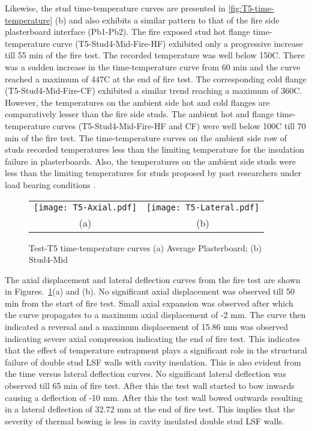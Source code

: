 Likewise, the stud time-temperature curves are presented in \cref{fig:T5-time-temperature} (b) and also exhibits a similar pattern to that of the fire side plasterboard interface (Pb1-Pb2). The fire exposed stud hot flange time-temperature curve (T5-Stud4-Mid-Fire-HF) exhibited only a progressive increase till 55 min of the fire test. The recorded temperature was well below 150\degree C. There was a sudden increase in the time-temperature curve from 60 min and the curve reached a maximum of 447\degree C at the end of fire test. The corresponding cold flange (T5-Stud4-Mid-Fire-CF) exhibited a similar trend reaching a maximum of 360\degree C. However, the temperatures on the ambient side hot and cold flanges are comparatively lesser than the fire side studs. The ambient hot and flange time-temperature curves (T5-Stud4-Mid-Fire-HF and CF) were well below 100\degree C till 70 min of the fire test. The time-temperature curves on the ambient side row of studs recorded temperatures less than the limiting temperature for the insulation failure in plasterboards. Also, the temperatures on the ambient side studs were less than the limiting temperatures for studs proposed by past researchers under load bearing conditions \citet{Feng2003,Gunalan2013a}. 
\begin{figure}[!htbp]
	\centering	
		\begin{tabular}{cc}
			\texttt{[image: T5-Axial.pdf]} & \texttt{[image: T5-Lateral.pdf]} \\
			(a) & (b) \\
			\end{tabular}
		\caption{Test-T5 time-temperature curves (a) Average Plasterboard; (b) Stud4-Mid}
		\label{fig:T5-displacement}
\end{figure}

The axial displacement and lateral deflection curves from the fire test are shown in Figures.~\ref{fig:T5-displacement}(a) and (b). No significant axial displacement was observed till 50 min from the start of fire test. Small axial expansion was observed after which the curve propagates to a maximum axial displacement of -2 mm. The curve then indicated a reversal and a maximum displacement of 15.86 mm was observed indicating severe axial compression indicating the end of fire test. This indicates that the effect of temperature entrapment plays a significant role in the structural failure of double stud LSF walls with cavity insulation. This is also evident from the time versus lateral deflection curves. No significant lateral deflection was observed till 65 min of fire test. After this the test wall started to bow inwards causing a deflection of -10 mm. After this the test wall bowed outwards resulting in a lateral deflection of 32.72 mm at the end of fire test. This implies that the severity of thermal bowing is less in cavity insulated double stud LSF walls. 

